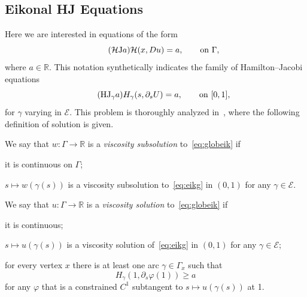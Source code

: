 \documentclass[11pt,a4paper,american]{article}
\newcommand{\Ecal}{\mathcal E}
\newcommand{\Hcal}{\mathcal H}
\newcommand{\Rds}{\mathds R}
\begin{document}
    \subsection{Eikonal HJ Equations}

    Here we are interested in equations of the form
    \begin{equation}\label{eq:globeik}\tag{\ensuremath{\Hcal}J\ensuremath{a}}
        \Hcal(x,Du)=a,\qquad\text{on }\Gamma,
    \end{equation}
    where $a\in\Rds$. This notation synthetically indicates the family of Hamilton--Jacobi equations
    \begin{equation}\label{eq:eikg}\tag{HJ\textsubscript{\ensuremath{\gamma}}\ensuremath{a}}
        H_\gamma(s,\partial_s U)=a,\qquad\text{on }[0,1],
    \end{equation}
    for $\gamma$ varying in $\Ecal$. This problem is thoroughly analyzed in~\cite{SiconolfiSorrentino18}, where the following definition of solution is given.

    \begin{defin}\label{defsol}
        We say that $w:\Gamma\to\Rds$ is a \emph{viscosity subsolution} to~\cref{eq:globeik} if
        \begin{myenum}
            \item it is continuous on $\Gamma$;
            \item $s\mapsto w(\gamma(s))$ is a viscosity subsolution to~\cref{eq:eikg} in $(0,1)$ for any $\gamma\in\Ecal$.
        \end{myenum}
        We say that $u:\Gamma\to\Rds$ is a \emph{viscosity solution} to~\cref{eq:globeik} if
        \begin{myenum}
            \item it is continuous;
            \item $s\mapsto u(\gamma(s))$ is a viscosity solution of~\cref{eq:eikg} in $(0,1)$ for any $\gamma\in\Ecal$;
            \item\label{stateconst} for every vertex $x$ there is at least one arc $\gamma\in\Gamma_x$ such that
            \begin{equation*}
                H_\gamma(1,\partial_s\varphi(1))\ge a
            \end{equation*}
            for any $\varphi$ that is a constrained $C^1$ subtangent to $s\mapsto u(\gamma(s))$ at 1.
        \end{myenum}
    \end{defin}
\end{document}
